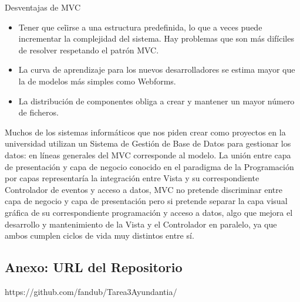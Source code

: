 \documentclass[10pt,a4paper]{report}
\begin{document}
Desventajas de MVC\

\begin{itemize}
\item Tener que ce\~{i}irse a una estructura predefinida, lo que a veces puede incrementar la complejidad del sistema. Hay problemas que son m\'{a}s difíciles de resolver respetando el patr\'{o}n MVC.
\item La curva de aprendizaje para los nuevos desarrolladores se estima mayor que la de modelos m\'{a}s simples como Webforms.
\item La distribuci\'{o}n de componentes obliga a crear y mantener un mayor n\'{u}mero de ficheros.
\end{itemize}
\bigskip
Muchos de los sistemas inform\'{a}ticos que nos piden crear como proyectos en la universidad utilizan un Sistema de Gesti\'{o}n de Base de Datos para gestionar los datos: en l\'{i}neas generales del MVC corresponde al modelo. La uni\'{o}n entre capa de presentaci\'{o}n y capa de negocio conocido en el paradigma de la Programaci\'{o}n por capas representar\'{i}a la integraci\'{o}n entre Vista y su correspondiente Controlador de eventos y acceso a datos, MVC no pretende discriminar entre capa de negocio y capa de presentaci\'{o}n pero si pretende separar la capa visual gr\'{a}fica de su correspondiente programaci\'{o}n y acceso a datos, algo que mejora el desarrollo y mantenimiento de la Vista y el Controlador en paralelo, ya que ambos cumplen ciclos de vida muy distintos entre s\'{i}.

\subsection{Anexo: URL del Repositorio}
\bigskip
https://github.com/fandub/Tarea3Ayundantia/
\end{document}
